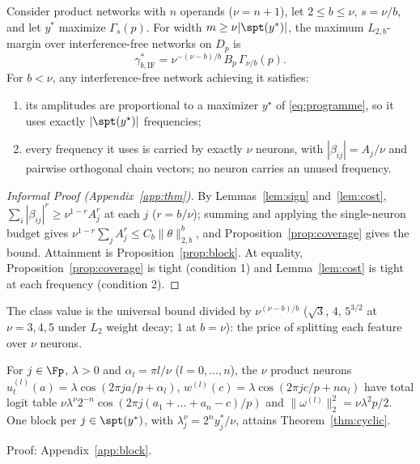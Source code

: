 \begin{theorem}\label{thm:cyclic}
Consider product networks with $n$ operands ($\nu=n+1$), let $2\le b\le\nu$, $s=\nu/b$, and let $y^*$ maximize $\Gamma_s(p)$. For width $m\ge\nu|\spt(y^*)|$, the maximum $L_{2,b}$-margin over interference-free networks on $D_p$ is
\[
\gamma^*_{b,\mathrm{IF}}=\nu^{-(\nu-b)/b}\,B_p\,\Gamma_{\nu/b}(p).
\]
For $b<\nu$, any interference-free network achieving it satisfies:
\begin{enumerate}
  \item its amplitudes are proportional to a maximizer $y^\star$ of \eqref{eq:programme}, so it uses exactly $|\spt(y^\star)|$ frequencies;
  \item every frequency it uses is carried by exactly $\nu$ neurons, with $|\beta_{ij}|=A_j/\nu$ and pairwise orthogonal chain vectors; no neuron carries an unused frequency.
\end{enumerate}
\end{theorem}

\begin{proof}[Informal Proof (Appendix~\ref{app:thm})]
By Lemmas~\ref{lem:sign} and~\ref{lem:cost}, $\sum_i|\beta_{ij}|^r\ge\nu^{1-r}A_j^r$ at each $j$ ($r=b/\nu$); summing and applying the single-neuron budget gives $\nu^{1-r}\sum_jA_j^r\le C_b\|\theta\|_{2,b}^b$, and Proposition~\ref{prop:coverage} gives the bound. Attainment is Proposition~\ref{prop:block}. At equality, Proposition~\ref{prop:coverage} is tight (condition 1) and Lemma~\ref{lem:cost} is tight at each frequency (condition 2).
\end{proof}

The class value is the universal bound divided by $\nu^{(\nu-b)/b}$ ($\sqrt3$, $4$, $5^{3/2}$ at $\nu=3,4,5$ under $L_2$ weight decay; $1$ at $b=\nu$): the price of splitting each feature over $\nu$ neurons. 

\begin{proposition}[]\label{prop:block}
For $j\in\Fp$, $\lambda>0$ and $\alpha_l=\pi l/\nu$ ($l=0,\dots,n$), the $\nu$ product neurons $u^{(l)}_t(a)=\lambda\cos(2\pi ja/p+\alpha_l)$, $w^{(l)}(c)=\lambda\cos(2\pi jc/p+n\alpha_l)$ have total logit table $\nu\lambda^\nu2^{-n}\cos(2\pi j(a_1+\dots+a_n-c)/p)$ and $\|\omega^{(l)}\|_2^2=\nu\lambda^2p/2$. One block per $j\in\spt(y^*)$, with $\lambda_j^\nu=2^ny^*_j/\nu$, attains Theorem~\ref{thm:cyclic}. 

Proof: Appendix~\ref{app:block}.
\end{proposition}

